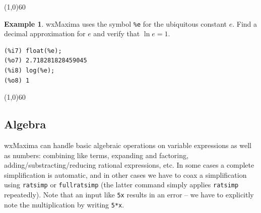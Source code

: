 \documentclass[10.5pt,twoside]{report}
\theoremstyle{definition}
\newtheorem{exmp}{Example}[section]
\begin{document}
\line(1,0){60}
\linethickness{0.5mm}


\begin{exmp}   wxMaxima uses the symbol \verb|%e| for the ubiquitous constant $e$.  Find a decimal approximation for $e$ and verify that $\ln{e}=1$.\\


\begin{verbatim}
(%i7) float(%e);
(%o7) 2.718281828459045
(%i8) log(%e);
(%o8) 1
\end{verbatim}

\end{exmp}

\line(1,0){60}
\linethickness{0.5mm}
${}$\\



\subsection{Algebra}

wxMaxima can handle basic algebraic operations on variable expressions as well as numbers:  combining like terms, expanding and factoring, adding/substracting/reducing rational expressions, etc.  In some cases a complete simplification is automatic, and in other cases we have to coax a simplification using \verb|ratsimp| or \verb|fullratsimp| (the latter command simply applies \verb|ratsimp| repeatedly).  Note that an input like \verb|5x| results in an error -- we have to explicitly note the multiplication by writing \verb|5*x|.
\end{document}
